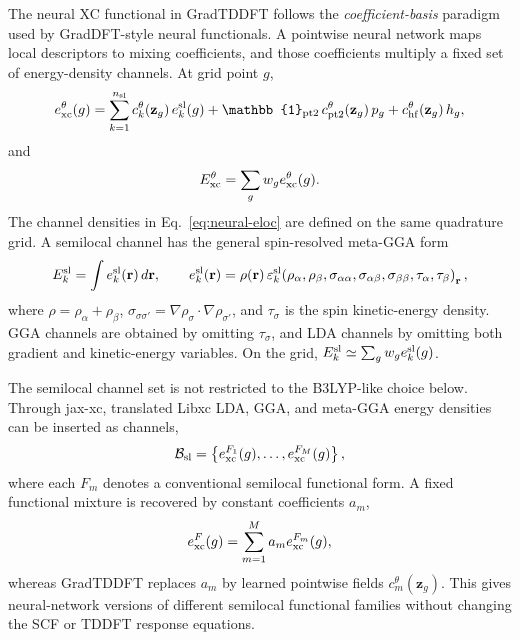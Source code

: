 The neural XC functional in GradTDDFT follows the
\emph{coefficient-basis} paradigm used by GradDFT-style neural
functionals. A pointwise neural network maps local descriptors to
mixing coefficients, and those coefficients multiply a fixed set of
energy-density channels. At grid point $g$,
\begin{equation}
  e_{\rm xc}^{\theta}(g)
  =
  \sum_{k=1}^{n_{\rm sl}}
  c_k^{\theta}(\mathbf{z}_g)\,e_k^{\rm sl}(g)
  + \mathbb{1}_{\rm pt2}\,
    c_{\rm pt2}^{\theta}(\mathbf{z}_g)\,p_g
  + c_{\rm hf}^{\theta}(\mathbf{z}_g)\,h_g,
  \label{eq:neural-eloc}
\end{equation}
and
\begin{equation}
  E_{\rm xc}^{\theta}
  =
  \sum_g w_g e_{\rm xc}^{\theta}(g).
  \label{eq:totalexc}
\end{equation}
The channel densities in Eq.~\eqref{eq:neural-eloc} are defined on
the same quadrature grid. A semilocal channel has the general
spin-resolved meta-GGA form
\begin{equation}
  E_k^{\rm sl}
  =
  \int e_k^{\rm sl}(\mathbf{r})\,d\mathbf{r},
  \qquad
  e_k^{\rm sl}(\mathbf{r})
  =
  \rho(\mathbf{r})\,
  \varepsilon_k^{\rm sl}
  \!\left(
    \rho_\alpha,\rho_\beta,
    \sigma_{\alpha\alpha},\sigma_{\alpha\beta},
    \sigma_{\beta\beta},
    \tau_\alpha,\tau_\beta
  \right)_{\mathbf{r}},
  \label{eq:semilocal-density}
\end{equation}
where
$\rho=\rho_\alpha+\rho_\beta$,
$\sigma_{\sigma\sigma'}=\nabla\rho_\sigma\cdot
\nabla\rho_{\sigma'}$, and $\tau_\sigma$ is the spin kinetic-energy
density. GGA channels are obtained by omitting $\tau_\sigma$, and
LDA channels by omitting both gradient and kinetic-energy variables.
On the grid, $E_k^{\rm sl}\simeq\sum_g w_g e_k^{\rm sl}(g)$.

The semilocal channel set is not restricted to the B3LYP-like
choice below. Through jax-xc,\cite{JAXXC} translated Libxc LDA,
GGA, and meta-GGA energy densities can be inserted as channels,
\begin{equation}
  \mathcal{B}_{\rm sl}
  =
  \left\{
    e_{\rm xc}^{F_1}(g),\ldots,e_{\rm xc}^{F_M}(g)
  \right\},
  \label{eq:jaxxc-basis}
\end{equation}
where each $F_m$ denotes a conventional semilocal functional form.
A fixed functional mixture is recovered by constant coefficients
$a_m$,
\begin{equation}
  e_{\rm xc}^{F}(g)=\sum_{m=1}^{M}a_m e_{\rm xc}^{F_m}(g),
  \label{eq:fixed-functional-mixture}
\end{equation}
whereas GradTDDFT replaces $a_m$ by learned pointwise fields
$c_m^\theta(\mathbf{z}_g)$. This gives neural-network versions of
different semilocal functional families without changing the SCF or
TDDFT response equations.

